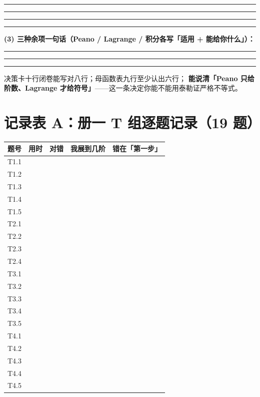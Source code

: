 \documentclass[10pt,a4paper]{ctexart}
\renewcommand{\arraystretch}{1.30}
\begin{document}
\noindent\rule{\linewidth}{0.25pt}\par\vspace{0.50cm}
\noindent\rule{\linewidth}{0.25pt}\par\vspace{0.50cm}
\noindent\rule{\linewidth}{0.25pt}\par\vspace{0.50cm}
\noindent\rule{\linewidth}{0.25pt}\par\vspace{0.50cm}
\textbf{(3) 三种余项一句话（Peano / Lagrange / 积分各写「适用 + 能给你什么」）：}
\par\smallskip\noindent\rule{\linewidth}{0.25pt}\par\vspace{0.50cm}
\noindent\rule{\linewidth}{0.25pt}\par\vspace{0.50cm}
\noindent\rule{\linewidth}{0.25pt}\par\vspace{0.50cm}
\begin{keypoint}[验收]
决策卡十行闭卷能写对八行；母函数表九行至少认出六行；
\textbf{能说清「Peano 只给阶数、Lagrange 才给符号」}——这一条决定你能不能用泰勒证严格不等式。
\end{keypoint}

\clearpage

\section*{记录表 A：册一 T 组逐题记录（19 题）}
\small\setlength{\tabcolsep}{4pt}
\renewcommand{\arraystretch}{2.30}
\begin{tabularx}{\linewidth}{c|c|c|p{4.2cm}|X}
\toprule
题号 & 用时 & 对错 & 我展到几阶 & 错在「第一步」 \\
\midrule
T1.1 & & & & \\
T1.2 & & & & \\
T1.3 & & & & \\
T1.4 & & & & \\
T1.5 & & & & \\
T2.1 & & & & \\
T2.2 & & & & \\
T2.3 & & & & \\
T2.4 & & & & \\
T3.1 & & & & \\
T3.2 & & & & \\
T3.3 & & & & \\
T3.4 & & & & \\
T3.5 & & & & \\
T4.1 & & & & \\
T4.2 & & & & \\
T4.3 & & & & \\
T4.4 & & & & \\
T4.5 & & & & \\
\bottomrule
\end{tabularx}
\renewcommand{\arraystretch}{1.30}
\normalsize
\end{document}
